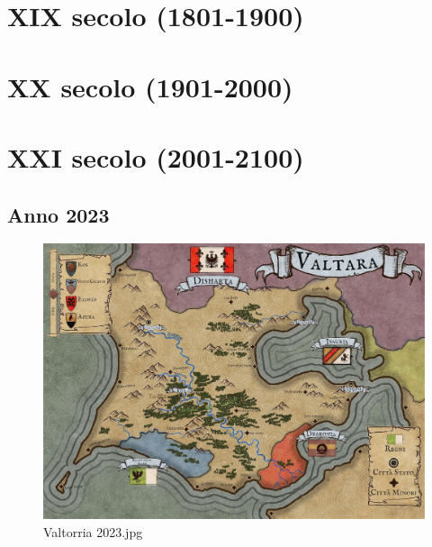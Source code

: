 \section{XIX secolo (1801-1900)}\label{xix-secolo-1801-1900}

\section{XX secolo (1901-2000)}\label{xx-secolo-1901-2000}

\section{XXI secolo (2001-2100)}\label{xxi-secolo-2001-2100}

\subsection{Anno 2023}\label{anno-2023}

\begin{figure}
\centering
\includegraphics{Valtorria_2023.jpg}
\caption{Valtorria 2023.jpg}
\end{figure}

